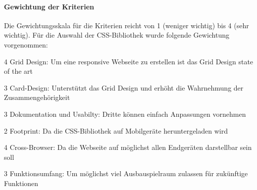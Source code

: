 \paragraph*{Gewichtung der Kriterien}
Die Gewichtungsskala für die Kriterien reicht von 1 (weniger wichtig) bis 4 (sehr wichtig). Für die Auswahl der CSS-Bibliothek wurde folgende Gewichtung vorgenommen:

\begin{itemize*}
\item 4 Grid Design: Um eine responsive Webseite zu erstellen ist das Grid Design state of the art
\item 3 Card-Design: Unterstützt das Grid Design und erhöht die Wahrnehmung der Zusammengehörigkeit
\item 3 Dokumentation und Usabilty: Dritte können einfach Anpassungen vornehmen
\item 2 Footprint: Da die CSS-Bibliothek auf Mobilgeräte heruntergeladen wird
\item 4 Cross-Browser: Da die Webseite auf möglichst allen Endgeräten darstellbar sein soll
\item 3 Funktionsumfang: Um möglichst viel Ausbauspielraum zulassen für zukünftige Funktionen
\end{itemize*}





%
%
%
%




